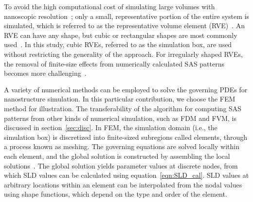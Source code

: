 \documentclass[preprint, 5p, times, twocolumn]{elsarticle}
\begin{document}
To avoid the high computational cost of simulating large volumes with nanoscopic resolution~\cite{gates2005computational, ghavanloo2019computational}; only a small, representative portion of the entire system is simulated, which is referred to as the representative volume element (RVE)~\cite{chen2004square}. An RVE can have any shape, but cubic or rectangular shapes are most commonly used~\cite{chenxin2023phase, steinbach2009phase, tourret2022phase}. In this study, cubic RVEs, referred to as the simulation box, are used without restricting the generality of the approach. For irregularly shaped RVEs, the removal of finite-size effects from numerically calculated SAS patterns becomes more challenging~\cite{majumdar2024computation}.

A variety of numerical methods can be employed to solve the governing PDEs for nanostructure simulation. In this particular contribution, we choose the FEM method for illustration. The transferability of the algorithm for computing SAS patterns from other kinds of numerical simulation, such as FDM and FVM, is discussed in section~\ref{sec:disc}. In FEM, the simulation domain (i.e., the simulation box) is discretized into finite-sized subregions called elements, through a process known as meshing. The governing equations are solved locally within each element, and the global solution is constructed by assembling the local solutions~\cite{dick2009introduction}. The global solution yields parameter values at discrete nodes, from which SLD values can be calculated using equation~\ref{eqn:SLD_cal}. SLD values at arbitrary locations within an element can be interpolated from the nodal values using shape functions, which depend on the type and order of the element.
\end{document}
